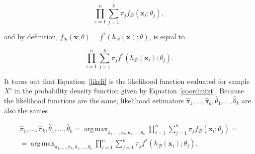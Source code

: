 \documentclass[10pt, a4paper]{article}
\DeclareMathOperator*{\argmax}{arg\,max}
\begin{document}
\begin{equation}
\prod_{i=1}^n \sum_{j=1}^k \pi_j f_\mathcal{B}(\textbf{x}_i; \theta_j),
\end{equation}

and by definition, $f_\mathcal{B}(\textbf{x} ; \theta) = f^*(h_\mathcal{B}(\textbf{x}) ; \theta)$, is equal to 

\begin{equation}\label{likeli}
\prod_{i=1}^n \sum_{j=1}^k \pi_j f^*(h_\mathcal{B}(\textbf{x}_i); \theta_j).
\end{equation}

It turns out that Equation~\ref{likeli} is the likelihood function evaluated for sample $X'$ in the probability density function given by Equation~\ref{coordmixt}. Because the likelihood functions are the same, likelihood estimators $\hat{\pi}_1, \dots, \hat{\pi}_k, \hat{\theta}_1, \dots, \hat{\theta}_k$ are also the sames

\begin{eqnarray}
\hat{\pi}_1, \dots, \hat{\pi}_k, \hat{\theta}_1, \dots, \hat{\theta}_k = \argmax_{\pi_1, \dots, \pi_k, \theta_1, \dots, \theta_k} \prod_{i=1}^n \sum_{j=1}^k \pi_j f_\mathcal{B}(\textbf{x}_i; \theta_j) = \\ 
= \argmax_{\pi_1, \dots, \pi_k, \theta_1, \dots, \theta_k} \prod_{i=1}^n \sum_{j=1}^k \pi_j f^*(h_\mathcal{B}(\textbf{x}_i); \theta_j).
\end{eqnarray}
\end{document}
